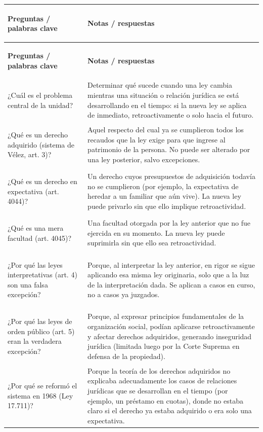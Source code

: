 \documentclass[12pt,oneside]{book}
\begin{document}
\begin{longtable}{>{\bfseries\raggedright\arraybackslash}p{} p{}}
\toprule
\textbf{Preguntas / palabras clave} & \textbf{Notas / respuestas} \\
\midrule
\endfirsthead
\toprule
\textbf{Preguntas / palabras clave} & \textbf{Notas / respuestas} \\
\midrule
\endhead
\bottomrule
\endfoot
\bottomrule
\endlastfoot

¿Cuál es el problema central de la unidad? &
Determinar qué sucede cuando una ley cambia mientras una situación o relación jurídica se está desarrollando en el tiempo: si la nueva ley se aplica de inmediato, retroactivamente o solo hacia el futuro. \\
\midrule

¿Qué es un derecho adquirido (sistema de Vélez, art. 3)? &
Aquel respecto del cual ya se cumplieron todos los recaudos que la ley exige para que ingrese al patrimonio de la persona. No puede ser alterado por una ley posterior, salvo excepciones. \\
\midrule

¿Qué es un derecho en expectativa (art. 4044)? &
Un derecho cuyos presupuestos de adquisición todavía no se cumplieron (por ejemplo, la expectativa de heredar a un familiar que aún vive). La nueva ley puede privarlo sin que ello implique retroactividad. \\
\midrule

¿Qué es una mera facultad (art. 4045)? &
Una facultad otorgada por la ley anterior que no fue ejercida en su momento. La nueva ley puede suprimirla sin que ello sea retroactividad. \\
\midrule

¿Por qué las leyes interpretativas (art. 4) son una falsa excepción? &
Porque, al interpretar la ley anterior, en rigor se sigue aplicando esa misma ley originaria, solo que a la luz de la interpretación dada. Se aplican a casos en curso, no a casos ya juzgados. \\
\midrule

¿Por qué las leyes de orden público (art. 5) eran la verdadera excepción? &
Porque, al expresar principios fundamentales de la organización social, podían aplicarse retroactivamente y afectar derechos adquiridos, generando inseguridad jurídica (limitada luego por la Corte Suprema en defensa de la propiedad). \\
\midrule

¿Por qué se reformó el sistema en 1968 (Ley 17.711)? &
Porque la teoría de los derechos adquiridos no explicaba adecuadamente los casos de relaciones jurídicas que se desarrollan en el tiempo (por ejemplo, un préstamo en cuotas), donde no estaba claro si el derecho ya estaba adquirido o era solo una expectativa. \\
\midrule


\end{longtable}
\end{document}
